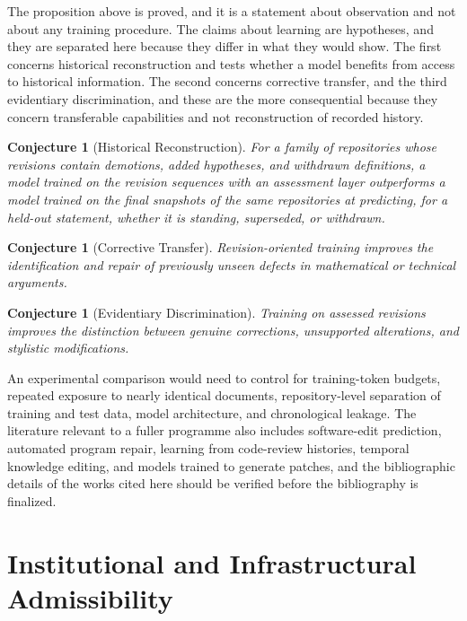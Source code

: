 \documentclass[12pt,oneside,openany]{book}
\theoremstyle{spherepop}
\newtheorem{conjecture}[definition]{Conjecture}
\theoremstyle{remarkstyle}
\begin{document}
The proposition above is proved, and it is a statement about observation and not about any training procedure. The claims about learning are hypotheses, and they are separated here because they differ in what they would show. The first concerns historical reconstruction and tests whether a model benefits from access to historical information. The second concerns corrective transfer, and the third evidentiary discrimination, and these are the more consequential because they concern transferable capabilities and not reconstruction of recorded history.

\begin{conjecture}[Historical Reconstruction]
For a family of repositories whose revisions contain demotions, added hypotheses, and withdrawn definitions, a model trained on the revision sequences with an assessment layer outperforms a model trained on the final snapshots of the same repositories at predicting, for a held-out statement, whether it is standing, superseded, or withdrawn.
\end{conjecture}

\begin{conjecture}[Corrective Transfer]
Revision-oriented training improves the identification and repair of previously unseen defects in mathematical or technical arguments.
\end{conjecture}

\begin{conjecture}[Evidentiary Discrimination]
Training on assessed revisions improves the distinction between genuine corrections, unsupported alterations, and stylistic modifications.
\end{conjecture}

An experimental comparison would need to control for training-token budgets, repeated exposure to nearly identical documents, repository-level separation of training and test data, model architecture, and chronological leakage. The literature relevant to a fuller programme also includes software-edit prediction, automated program repair, learning from code-review histories, temporal knowledge editing, and models trained to generate patches, and the bibliographic details of the works cited here should be verified before the bibliography is finalized.

\chapter{Institutional and Infrastructural Admissibility}
\label{ch:infra}
\end{document}
